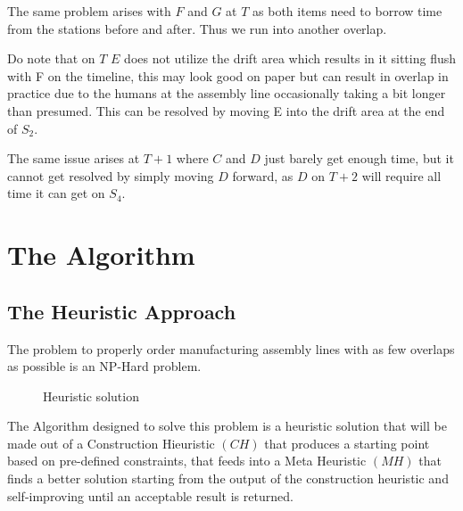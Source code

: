 \documentclass[12pt,a4paper]{report}
\begin{document}
The same problem arises with $F$ and $G$ at $T$ as both items need to borrow time from the stations before and after. Thus we run into another overlap.

Do note that on $T$ $E$ does not utilize the drift area which results in it sitting flush with F on the timeline, this may look good on paper but can result in overlap in practice due to the humans at the assembly line occasionally taking a bit longer than presumed. This can be resolved by moving E into the drift area at the end of $S_2$. 

The same issue arises at $T+1$ where $C$ and $D$ just barely get enough time, but it cannot get resolved by simply moving $D$ forward, as $D$ on $T+2$ will require all time it can get on $S_4$. 


\section{The Algorithm}
\subsection{The Heuristic Approach}

The problem to properly order manufacturing assembly lines with as few overlaps as possible is an NP-Hard problem. 

\begin{figure}[ht]
    \centering

    \caption{Heuristic solution}
    \label{fig:solution}
\end{figure}

The Algorithm designed to solve this problem is a heuristic solution that will be made out of a Construction Hieuristic $(C\!H)$ that produces a starting point based on pre-defined constraints, that feeds into a Meta Heuristic $(M\!H)$ that finds a better solution starting from the output of the construction heuristic and self-improving until an acceptable result is returned. 
\end{document}
